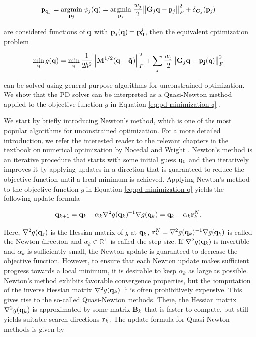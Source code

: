 \[
    \mathbf{p}_{\mathbf{q}_j} 
    = \underset{\mathbf{p}_j}{\operatorname{argmin}}\; \psi_j(\mathbf{q}) 
    = \underset{\mathbf{p}_j}{\operatorname{argmin}}\; \frac{w_j}{2} \norm{\mathbf{G}_j\mathbf{q} - \mathbf{p}_j}^2_F + \delta_{\bm{C}_j}(\mathbf{p}_j)
\]

\noindent are considered functions of $\mathbf{q}$ with $\mathbf{p}_j(\mathbf{q}) = \mathbf{p}^j_{\mathbf{q}}$, then the equivalent optimization problem

\begin{equation}\label{eq:pd-minimization-q}
    \min_{\mathbf{q}} g(\mathbf{q}) = 
    \min_{\mathbf{q}} \frac{1}{2h^2} \norm{\mathbf{M}^{1/2}(\mathbf{q} - \tilde{\mathbf{q}})}^2_F + \sum_j \frac{w_j}{2} \norm{\mathbf{G}_j\mathbf{q}
    - \mathbf{p_j}(\mathbf{q})}^2_F
\end{equation}

\noindent can be solved using general purpose algorithms for unconstrained optimization. We show that the PD solver can be interpreted as a Quasi-Newton 
method applied to the objective function $g$ in Equation \ref{eq:pd-minimization-q} \cite{liu2017}.

We start by briefly introducing Newton's method, which is one of the most popular algorithms for unconstrained optimization. For a more detailed introduction, 
we refer the interested reader to the relevant chapters in the textbook on numerical optimization by Nocedal and Wright \cite{nocedal2006}. Newton's method 
is an iterative procedure that starts with some initial guess $\mathbf{q}_0$ and then iteratively improves it by applying updates in a direction that is 
guaranteed to reduce the objective function until a local minimum is achieved. Applying Newton's method to the objective function $g$ in Equation 
\ref{eq:pd-minimization-q} yields the following update formula 

\begin{equation}\label{eq:pd-newton-update}
    \mathbf{q}_{k+1} = \mathbf{q}_k - \alpha_k \nabla^2 g(\mathbf{q}_k)^{-1} \nabla g(\mathbf{q}_k) = \mathbf{q}_k - \alpha_k \mathbf{r}^N_k.
\end{equation}

\noindent Here, $\nabla^2 g(\mathbf{q}_k)$ is the Hessian matrix of $g$ at $\mathbf{q}_k$, $\mathbf{r}^N_k = \nabla^2 g(\mathbf{q}_k)^{-1} \nabla g(\mathbf{q}_k)$ 
is called the Newton direction and $\alpha_k \in \mathbb{R}^+$ is called the step size. If $\nabla^2 g(\mathbf{q}_k)$ is invertible and $\alpha_k$ is 
sufficiently small, the Newton update is guaranteed to decrease the objective function. However, to ensure that each Newton update makes sufficient progress 
towards a local minimum, it is desirable to keep $\alpha_k$ as large as possible. Newton's method exhibits favorable convergence properties, but the computation 
of the inverse Hessian matrix $\nabla^2 g(\mathbf{q}_k)^{-1}$ is often prohibitively expensive. This gives rise to the so-called Quasi-Newton methods. There, the 
Hessian matrix $\nabla^2 g(\mathbf{q}_k)$ is approximated by some matrix $\mathbf{B}_k$ that is faster to compute, but still yields suitable search directions 
$\mathbf{r}_k$. The update formula for Quasi-Newton methods is given by

